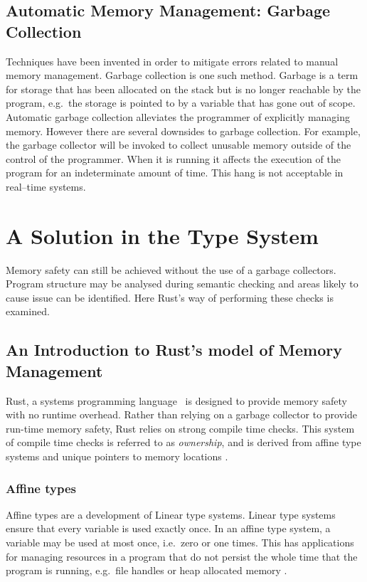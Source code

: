 

\subsection{Automatic Memory Management: Garbage Collection}
Techniques have been invented in order to mitigate errors related to manual
memory management. Garbage collection is one such method.  Garbage is a term
for storage that has been allocated on the stack but is no longer reachable by
the program, e.g.\ the storage is pointed to by a variable that has gone out of
scope. Automatic garbage collection alleviates the programmer of explicitly
managing memory. However there are several downsides to garbage collection. For
example, the garbage collector will be invoked to collect unusable memory
outside of the control of the programmer. When it is running it affects the
execution of the program for an indeterminate amount of time. This hang is not
acceptable in real--time systems.

\section{A Solution in the Type System}
Memory safety can still be achieved without the use of a garbage collectors.
Program structure may be analysed during semantic checking and areas likely to
cause issue can be identified. Here Rust's way of performing these checks is
examined.

\subsection{An Introduction to Rust's model of Memory Management}
Rust, a systems programming language~\cite{rust} is designed to provide memory
safety with no runtime overhead. Rather than relying on a garbage collector to
provide run-time memory safety, Rust relies on strong compile time checks.
This system of compile time checks is referred to as \textit{ownership}, and is
derived from affine type systems and unique pointers to memory
locations\cite{rust-borrowing} \cite{levy2015ownership}.

\subsubsection{Affine types}
Affine types are a development of Linear type systems. Linear type systems
ensure that every variable is used exactly once. In an affine type system, a
variable may be used at most once, i.e.\ zero or one times. This has applications
for managing resources in a program that do not persist the whole time that the
program is running, e.g.\ file handles or heap allocated memory \cite{attapl}
\cite{tovAffine}.

